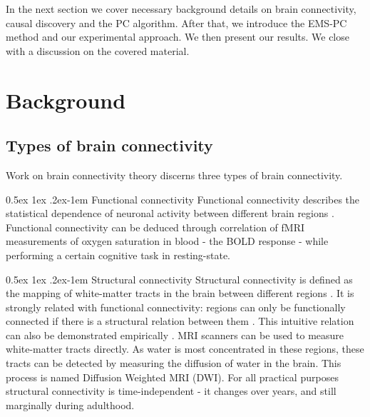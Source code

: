 \documentclass[a4paper, english]{article}
\makeatletter
\renewcommand{\paragraph}{%
  \@startsection{paragraph}{4}%
  {\z@}{0.5ex \@plus 1ex \@minus .2ex}{-1em}%
  {\normalfont\normalsize\bfseries}%
}
\makeatother
\begin{document}
In the next section we cover necessary background details on brain connectivity, causal discovery and the PC algorithm.
After that, we introduce the EMS-PC method and our experimental approach.
We then present our results.
We close with a discussion on the covered material.

\section{Background}
\subsection{Types of brain connectivity}
Work on brain connectivity theory discerns three types of brain connectivity.

\paragraph{Functional connectivity}
Functional connectivity describes the statistical dependence of neuronal activity between different brain regions \cite{friston1993functional}.
Functional connectivity can be deduced through correlation of fMRI measurements of oxygen saturation  in blood - the BOLD response - while performing a certain cognitive task in resting-state.

\paragraph{Structural connectivity}
Structural connectivity is defined as the mapping of white-matter tracts in the brain between different regions \cite{friston1994}.
It is strongly related with functional connectivity: regions can only be functionally connected if there is a structural relation between them \cite{cabral2012}.
This intuitive relation can also be demonstrated empirically \cite{vandenheuvel2009}.
MRI scanners can be used to measure white-matter tracts directly.
As water is most concentrated in these regions, these tracts can be detected by measuring the diffusion of water in the brain.
This process is named Diffusion Weighted MRI (DWI).
For all practical purposes structural connectivity is time-independent - it changes over years, and still marginally during adulthood.
\end{document}

